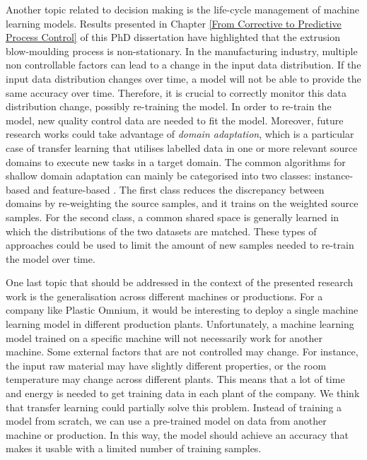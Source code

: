 Another topic related to decision making is the life-cycle management of machine learning models. Results presented in Chapter \ref{From Corrective to Predictive Process Control} of this PhD dissertation have highlighted that the extrusion blow-moulding process is non-stationary. In the manufacturing industry, multiple non controllable factors can lead to a change in the input data distribution. If the input data distribution changes over time, a model will not be able to provide the same accuracy over time. Therefore, it is crucial to correctly monitor this data distribution change, possibly re-training the model. In order to re-train the model, new quality control data are needed to fit the model. Moreover, future research works could take advantage of \textit{domain adaptation}, which is a particular case of transfer learning that utilises labelled data in one or more relevant source domains to execute new tasks in a target domain. The common algorithms for shallow domain adaptation can mainly be categorised into two classes: instance-based \citep{bruzzone2009domain,chu2013selective} and feature-based \citep{gheisari2015unsupervised, gong2013connecting, pan2010domain}. The first class reduces the discrepancy between domains by re-weighting the source samples, and it trains on the weighted source samples. For the second class, a common shared space is generally learned in which the distributions of the two datasets are matched. These types of approaches could be used to limit the amount of new samples needed to re-train the model over time.

One last topic that should be addressed in the context of the presented research work is the generalisation across different machines or productions. For a company like Plastic Omnium, it would be interesting to deploy a single machine learning model in different production plants. Unfortunately, a machine learning model trained on a specific machine will not necessarily work for another machine. Some external factors that are not controlled may change. For instance, the input raw material may have slightly different properties, or the room temperature may change across different plants. This means that a lot of time and energy is needed to get training data in each plant of the company. We think that transfer learning could partially solve this problem. Instead of training a model from scratch, we can use a pre-trained model on data from another machine or production. In this way, the model should achieve an accuracy that makes it usable with a limited number of training samples.     

\clearpage